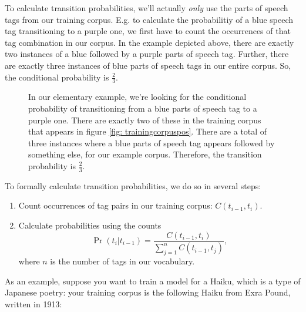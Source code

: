 \documentclass[12pt]{article}
\begin{document}
To calculate transition probabilities, we'll actually \emph{only} use the parts of speech tags from our training corpus. E.g. to calculate the probabilitiy of a blue speech tag transitioning to a purple one, we first have to count the occurrences of that tag combination in our corpus. In the example depicted above, there are exactly two instances of a blue followed by a purple parts of speech tag. Further, there are exactly three instances of blue parts of speech tags in our entire corpus. So, the conditional probability is $\frac{2}{3}$.

\begin{figure}
  \begin{center}
    \caption{In our elementary example, we're looking for the conditional probability of transitioning from a blue parts of speech tag to a purple one. There are exactly two of these in the training corpus that appears in figure \ref{fig: trainingcorpuspos}. There are a total of three instances where a blue parts of speech tag appears followed by something else, for our example corpus. Therefore, the transition probability is $\frac{2}{3}$.}
  \end{center}
\end{figure}

To formally calculate transition probabilities, we do so in several steps:
\begin{enumerate}
\item Count occurrences of tag pairs in our training corpus: $C(t_{i-1}, t_i)$.
\item Calculate probabilities using the counts
  \[
    \Pr(t_i | t_{i-1}) = \frac{C(t_{i-1}, t_i)}{\sum_{j=1}^{n} C(t_{i-1}, t_j)},
  \]
  where $n$ is the number of tags in our vocabulary.
\end{enumerate}

As an example, suppose you want to train a model for a Haiku, which is a type of Japanese poetry: your training corpus is the following Haiku from Exra Pound, written in 1913:
\end{document}
